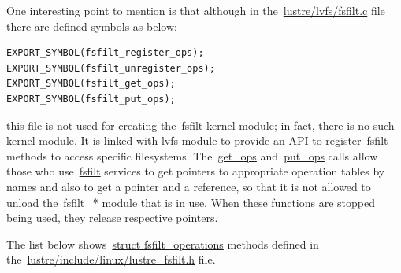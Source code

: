 One interesting point to mention is that although in
the~\url{lustre/lvfs/fsfilt.c} file there are defined symbols
as below:

\begin{Verbatim}
EXPORT_SYMBOL(fsfilt_register_ops);
EXPORT_SYMBOL(fsfilt_unregister_ops);
EXPORT_SYMBOL(fsfilt_get_ops);
EXPORT_SYMBOL(fsfilt_put_ops);
\end{Verbatim}

this file is not used for creating the~\url{fsfilt} kernel module; in fact,
there is no such kernel module. It is linked with \url{lvfs} module to provide
an API to register~\url{fsfilt} methods to access specific filesystems.
The~\url{get_ops} and~\url{put_ops} calls allow those who use~\url{fsfilt}
services to get pointers to appropriate operation tables by names and also to
get a pointer and a reference, so that it is not allowed to
unload the~\url{fsfilt_*} module that is in use. When these functions are stopped
being used, they release respective pointers.

The list below shows~\url{struct fsfilt_operations} methods defined
in the~\url{lustre/include/linux/lustre_fsfilt.h} file.

